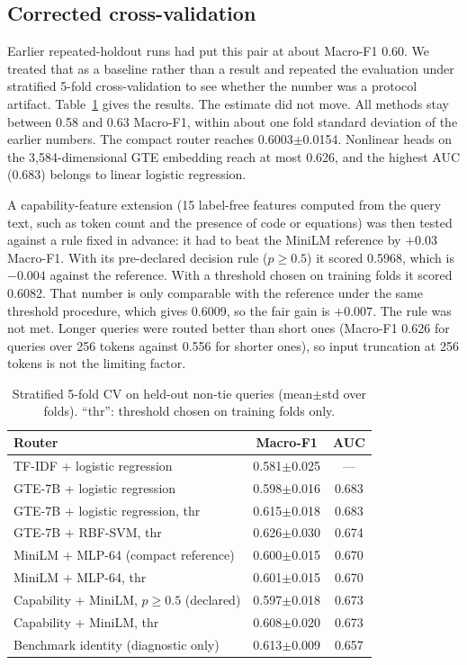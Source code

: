 \documentclass[lettersize,journal]{IEEEtran}
\begin{document}
\subsection{Corrected cross-validation}
\label{sec:a-cv}
Earlier repeated-holdout runs had put this pair at about Macro-F1 0.60. We treated that as a baseline rather than a result and repeated the evaluation under stratified 5-fold cross-validation to see whether the number was a protocol artifact. Table~\ref{tab:cv} gives the results. The estimate did not move. All methods stay between 0.58 and 0.63 Macro-F1, within about one fold standard deviation of the earlier numbers. The compact router reaches 0.6003$\pm$0.0154. Nonlinear heads on the 3,584-dimensional GTE embedding reach at most 0.626, and the highest AUC (0.683) belongs to linear logistic regression.

A capability-feature extension (15 label-free features computed from the query text, such as token count and the presence of code or equations) was then tested against a rule fixed in advance: it had to beat the MiniLM reference by $+0.03$ Macro-F1. With its pre-declared decision rule ($p\geq0.5$) it scored 0.5968, which is $-0.004$ against the reference. With a threshold chosen on training folds it scored 0.6082. That number is only comparable with the reference under the same threshold procedure, which gives 0.6009, so the fair gain is $+0.007$. The rule was not met. Longer queries were routed better than short ones (Macro-F1 0.626 for queries over 256 tokens against 0.556 for shorter ones), so input truncation at 256 tokens is not the limiting factor.

\begin{table}[t]
\centering
\caption{Stratified 5-fold CV on held-out non-tie queries (mean$\pm$std over folds). ``thr'': threshold chosen on training folds only.}
\label{tab:cv}
\footnotesize
\setlength{\tabcolsep}{3pt}
\begin{tabular}{@{}lcc@{}}
\toprule
Router & Macro-F1 & AUC \\
\midrule
TF-IDF + logistic regression & 0.581$\pm$0.025 & --- \\
GTE-7B + logistic regression & 0.598$\pm$0.016 & 0.683 \\
GTE-7B + logistic regression, thr & 0.615$\pm$0.018 & 0.683 \\
GTE-7B + RBF-SVM, thr & 0.626$\pm$0.030 & 0.674 \\
MiniLM + MLP-64 (compact reference) & 0.600$\pm$0.015 & 0.670 \\
MiniLM + MLP-64, thr & 0.601$\pm$0.015 & 0.670 \\
Capability + MiniLM, $p\geq0.5$ (declared) & 0.597$\pm$0.018 & 0.673 \\
Capability + MiniLM, thr & 0.608$\pm$0.020 & 0.673 \\
\midrule
Benchmark identity (diagnostic only) & 0.613$\pm$0.009 & 0.657 \\
\bottomrule
\end{tabular}
\end{table}
\end{document}

